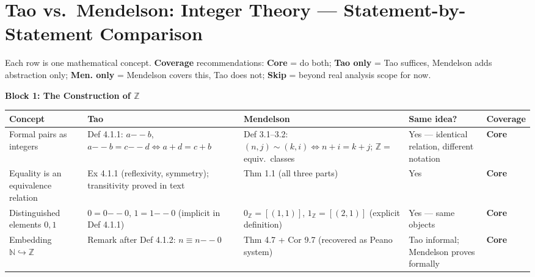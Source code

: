 
\clearpage
\section*{Tao vs.\ Mendelson: Integer Theory --- Statement-by-Statement Comparison}

\begin{remark*}
Each row is one mathematical concept.
\textbf{Coverage} recommendations: \textbf{Core} = do both;
\textbf{Tao only} = Tao suffices, Mendelson adds abstraction only;
\textbf{Men. only} = Mendelson covers this, Tao does not;
\textbf{Skip} = beyond real analysis scope for now.
\end{remark*}

\begin{exposition}
\bigskip
\end{exposition}

\noindent\textbf{Block 1: The Construction of $\mathbb{Z}$}

\begin{exposition}
\smallskip
\end{exposition}
\begin{tabular}{p{} p{} p{} p{} p{}}
\toprule
\textbf{Concept} & \textbf{Tao} & \textbf{Mendelson} & \textbf{Same idea?} & \textbf{Coverage} \\
\midrule

Formal pairs as integers
& Def 4.1.1: $a{-\!\!-}b$, $a{-\!\!-}b=c{-\!\!-}d\iff a+d=c+b$
& Def 3.1--3.2: $(n,j)\sim(k,i)\iff n+i=k+j$; $\mathbb{Z}=$ equiv.\ classes
& Yes --- identical relation, different notation
& \textbf{Core}
\\[6pt]

Equality is an equivalence relation
& Ex 4.1.1 (reflexivity, symmetry); transitivity proved in text
& Thm 1.1 (all three parts)
& Yes
& \textbf{Core}
\\[6pt]

Distinguished elements $0,1$
& $0=0{-\!\!-}0$, $1=1{-\!\!-}0$ (implicit in Def 4.1.1)
& $0_\mathbb{Z}=[(1,1)]$, $1_\mathbb{Z}=[(2,1)]$ (explicit definition)
& Yes --- same objects
& \textbf{Core}
\\[6pt]

Embedding $\mathbb{N}\hookrightarrow\mathbb{Z}$
& Remark after Def 4.1.2: $n\equiv n{-\!\!-}0$
& Thm 4.7 + Cor 9.7 (recovered as Peano system)
& Tao informal; Mendelson proves formally
& \textbf{Core}
\\

\bottomrule
\end{tabular}

